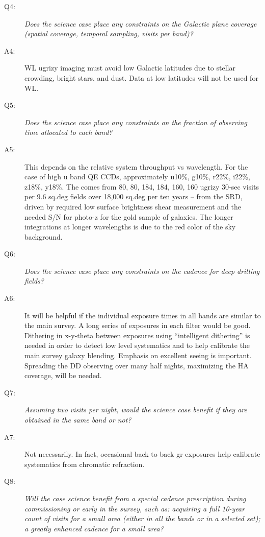 \begin{description}
\item[Q4:] {\it Does the science case place any constraints on the
Galactic plane coverage (spatial coverage, temporal sampling, visits per
band)?}

\item[A4:] WL ugrizy imaging must avoid low Galactic latitudes due to
stellar crowding, bright stars, and dust. Data at low latitudes will not
be used for WL.

\item[Q5:] {\it Does the science case place any constraints on the
fraction of observing time allocated to each band?}

\item[A5:] This depends on the relative system throughput vs wavelength.
For the case of high u band QE CCDs, approximately u10\%, g10\%, r22\%,
i22\%, z18\%, y18\%. The comes from 80, 80, 184, 184, 160, 160 ugrizy
30-sec visits per 9.6 sq.deg fields over 18,000 sq.deg per ten years --
from the SRD, driven by required low surface brightness shear
measurement and the needed S/N for photo-z for the gold sample of
galaxies. The longer integrations at longer wavelengths is due to the
red color of the sky background.

\item[Q6:] {\it Does the science case place any constraints on the
cadence for deep drilling fields?}

\item[A6:] It will be helpful if the individual exposure times in all
bands are similar to the main survey. A long series of exposures in each
filter would be good. Dithering in x-y-theta between exposures using
“intelligent dithering” is needed in order to detect low level
systematics and to help calibrate the main survey galaxy blending.
Emphasis on excellent seeing is important. Spreading the DD observing
over many half nights, maximizing the HA coverage, will be needed.

\item[Q7:] {\it Assuming two visits per night, would the science case
benefit if they are obtained in the same band or not?}

\item[A7:] Not necessarily. In fact, occasional back-to back gr
exposures help calibrate systematics from chromatic refraction.

\item[Q8:] {\it Will the case science benefit from a special cadence
prescription during commissioning or early in the survey, such as:
acquiring a full 10-year count of visits for a small area (either in all
the bands or in a  selected set); a greatly enhanced cadence for a small
area?}


\end{description}
